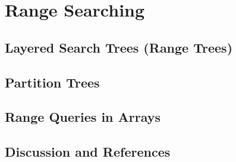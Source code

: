 \chapter{Range Searching}
\section{Layered Search Trees (Range Trees)}
\section{Partition Trees}
\section{Range Queries in Arrays}
\section{Discussion and References}


